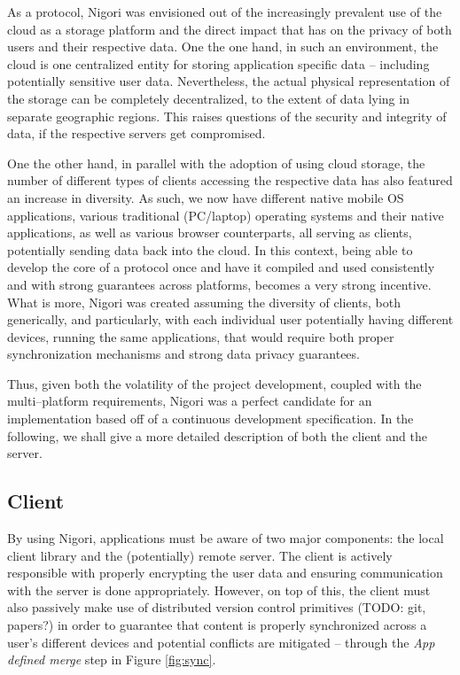As a protocol, Nigori was envisioned out of the increasingly prevalent use of the cloud as a storage platform and the direct impact that has on the privacy of both users and their respective data.
One the one hand, in such an environment, the cloud is one centralized entity for storing application specific data -- including potentially sensitive user data.
Nevertheless, the actual physical representation of the storage can be completely decentralized, to the extent of data lying in separate geographic regions.
This raises questions of the security and integrity of data, if the respective servers get compromised.

One the other hand, in parallel with the adoption of using cloud storage, the number of different types of clients accessing the respective data has also featured an increase in diversity.
As such, we now have different native mobile OS applications, various traditional (PC/laptop) operating systems and their native applications, as well as various browser counterparts, all serving as clients, potentially sending data back into the cloud.
In this context, being able to develop the core of a protocol once and have it compiled and used consistently and with strong guarantees across platforms, becomes a very strong incentive.
What is more, Nigori was created assuming the diversity of clients, both generically, and particularly, with each individual user potentially having different devices, running the same applications, that would require both proper synchronization mechanisms and strong data privacy guarantees.

Thus, given both the volatility of the project development, coupled with the multi--platform requirements, Nigori was a perfect candidate for an implementation based off of a continuous development specification.
In the following, we shall give a more detailed description of both the client and the server.

\subsection{Client}
By using Nigori, applications must be aware of two major components: the local client library and the (potentially) remote server.
The client is actively responsible with properly encrypting the user data and ensuring communication with the server is done appropriately.
However, on top of this, the client must also passively make use of distributed version control primitives (TODO: git, papers?) in order to guarantee that content is properly synchronized across a user's different devices and potential conflicts are mitigated -- through the \textit{App defined merge} step in Figure \ref{fig:sync}.


